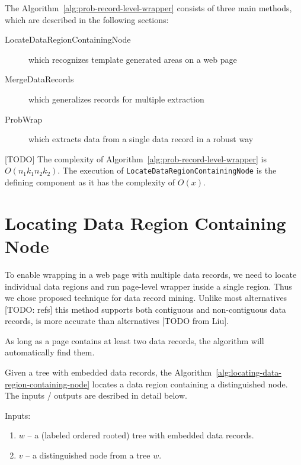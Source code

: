 
The Algorithm~\ref{alg:prob-record-level-wrapper} consists of three main methods, which are described in the following sections:
\begin{description}
	\item[LocateDataRegionContainingNode] which recognizes template generated areas on a web page
	\item[MergeDataRecords] which generalizes records for multiple extraction
	\item[ProbWrap] which extracts data from a single data record in a robust way
\end{description}

[TODO] The complexity of Algorithm~\ref{alg:prob-record-level-wrapper} is $O(n_1 k_1 n_2 k_2)$. The execution of \texttt{LocateDataRegionContainingNode} is the defining component as it has the complexity of $O(x)$.


\section{Locating Data Region Containing Node}

To enable wrapping in a web page with multiple data records, we need to locate individual data regions and run page-level wrapper inside a single region. Thus we chose \cite{liu2009a} proposed technique for data record mining. Unlike most alternatives [TODO: refs] this method supports both contiguous and non-contiguous data records, is more accurate than alternatives [TODO from Liu].

As long as a page contains at least two data records, the algorithm will automatically find them.

Given a tree with embedded data records, the Algorithm~\ref{alg:locating-data-region-containing-node} locates a data region containing a distinguished node. The inputs / outputs are desribed in detail below.

Inputs: 

\begin{enumerate}
	\item $w$ -- a (labeled ordered rooted) tree with embedded data records.
	\item $v$ -- a distinguished node from a tree $w$.
\end{enumerate}

